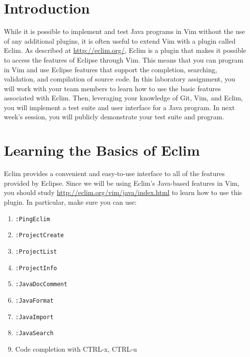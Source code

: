 

\usepackage[compact]{titlesec}



\section*{Introduction}

While it is possible to implement and test Java programs in Vim without the use of any additional plugins, it is often
useful to extend Vim with a plugin called Eclim.  As described at \url{http://eclim.org/}, Eclim is a plugin that makes
it possible to access the features of Eclipse through Vim.  This means that you can program in Vim and use Eclipse
features that support the completion, searching, validation, and compilation of source code. In this laboratory
assignment, you will work with your team members to learn how to use the basic features associated with Eclim.  Then,
leveraging your knowledge of Git, Vim, and Eclim, you will implement a test suite and user interface for a Java
program.  In next week's session, you will publicly demonstrate your test suite and program.

\section*{Learning the Basics of Eclim}

Eclim provides a convenient and easy-to-use interface to all of the features provided by Eclipse.  Since we will be
using Eclim's Java-based features in Vim, you should study \url{http://eclim.org/vim/java/index.html} to learn how to
use this plugin.  In particular, make sure you can use:

\begin{enumerate}
	\item {\tt :PingEclim}
	\item {\tt :ProjectCreate}
	\item {\tt :ProjectList}
	\item {\tt :ProjectInfo}
	\item {\tt :JavaDocComment}
	\item {\tt :JavaFormat}
	\item {\tt :JavaImport}
	\item {\tt :JavaSearch}
	\item Code completion with CTRL-x, CTRL-u 
\end{enumerate}

